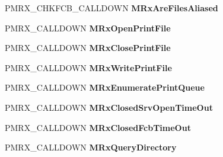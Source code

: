 \begin{DoxyCompactItemize}
\item 
\mbox{\label{struct___m_i_n_i_r_d_r___d_i_s_p_a_t_c_h_aacbefce1ac3362311fac68f14d3ad039}} 
P\+M\+R\+X\+\_\+\+C\+H\+K\+F\+C\+B\+\_\+\+C\+A\+L\+L\+D\+O\+WN {\bfseries M\+Rx\+Are\+Files\+Aliased}
\item 
\mbox{\label{struct___m_i_n_i_r_d_r___d_i_s_p_a_t_c_h_a62d6f4060bc117bd06c9d793dfc33e0e}} 
P\+M\+R\+X\+\_\+\+C\+A\+L\+L\+D\+O\+WN {\bfseries M\+Rx\+Open\+Print\+File}
\item 
\mbox{\label{struct___m_i_n_i_r_d_r___d_i_s_p_a_t_c_h_a79169ea1001685ff69e6e244d3df2fa2}} 
P\+M\+R\+X\+\_\+\+C\+A\+L\+L\+D\+O\+WN {\bfseries M\+Rx\+Close\+Print\+File}
\item 
\mbox{\label{struct___m_i_n_i_r_d_r___d_i_s_p_a_t_c_h_ab9dbe4756e1564762df068c7236c602c}} 
P\+M\+R\+X\+\_\+\+C\+A\+L\+L\+D\+O\+WN {\bfseries M\+Rx\+Write\+Print\+File}
\item 
\mbox{\label{struct___m_i_n_i_r_d_r___d_i_s_p_a_t_c_h_a2506f7b2cef65373196427a98b6c6f5f}} 
P\+M\+R\+X\+\_\+\+C\+A\+L\+L\+D\+O\+WN {\bfseries M\+Rx\+Enumerate\+Print\+Queue}
\item 
\mbox{\label{struct___m_i_n_i_r_d_r___d_i_s_p_a_t_c_h_ad6b222531dce21a81fdc48cfdf4a8f62}} 
P\+M\+R\+X\+\_\+\+C\+A\+L\+L\+D\+O\+WN {\bfseries M\+Rx\+Closed\+Srv\+Open\+Time\+Out}
\item 
\mbox{\label{struct___m_i_n_i_r_d_r___d_i_s_p_a_t_c_h_a1484248ec0be00e0f6e04ccdff74b6ed}} 
P\+M\+R\+X\+\_\+\+C\+A\+L\+L\+D\+O\+WN {\bfseries M\+Rx\+Closed\+Fcb\+Time\+Out}
\item 
\mbox{\label{struct___m_i_n_i_r_d_r___d_i_s_p_a_t_c_h_a5ad277f2ce5626e693caaba44969fde2}} 
P\+M\+R\+X\+\_\+\+C\+A\+L\+L\+D\+O\+WN {\bfseries M\+Rx\+Query\+Directory}
\item 
\mbox{\label{struct___m_i_n_i_r_d_r___d_i_s_p_a_t_c_h_aacedd4d2a9e51d68402082dcb1d8ecac}} 

\end{DoxyCompactItemize}
